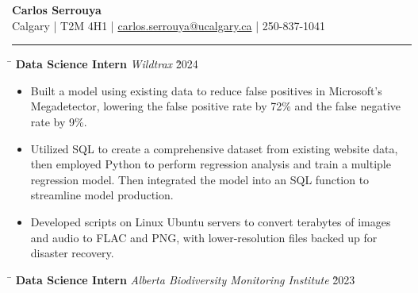 \documentclass[a4paper,11pt]{article}
\def\locationh{\hspace{7cm}}
\def\titlev{\vspace{.5cm}}
\def\sectionv{\vspace{.2cm}}
\def\subsectionv{\vspace{-5.3ex}}
\def\postpointsv{\vspace{0cm}}
\def\betweenjobsv{\vspace{0.4cm}}
\begin{document}
\begin{center}
    {\LARGE \textbf{Carlos Serrouya}} \\
    Calgary | T2M 4H1 | \href{mailto:carlos.serrouya@ucalgary.ca}{carlos.serrouya@ucalgary.ca} | 250-837-1041 \\
\end{center}

\titlev

\noindent {}
\vspace{-2.35em} %
\par\noindent
\rule{\textwidth}{0.4pt}

\sectionv

\noindent \begin{tabbing}
    \locationh \= \kill
    \textbf{Data Science Intern} \> \textit{Wildtrax} \` 2024 \\
\end{tabbing}


\begin{itemize}[leftmargin=.5cm, itemsep=.1cm, before=\subsectionv, after=\postpointsv]
    \item Built a model using existing data to reduce false positives in Microsoft's Megadetector, lowering the false positive rate by 72\% and the false negative rate by 9\%.
    \item Utilized SQL to create a comprehensive dataset from existing website data, then employed Python to perform regression analysis and train a multiple regression model. Then integrated the model into an SQL function to streamline model production.
    \item Developed scripts on Linux Ubuntu servers to convert terabytes of images and audio to FLAC and PNG, with lower-resolution files backed up for disaster recovery.
\end{itemize}

\betweenjobsv

\begin{tabbing}
    \locationh \= \kill
    \textbf{Data Science Intern} \> \textit{Alberta Biodiversity Monitoring Institute} \` 2023 \\
\end{tabbing}
\end{document}
